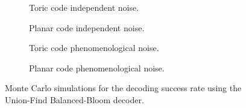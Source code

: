 \begin{figure}[htbp]
  \centering
  \begin{subfigure}[b]{0.49\textwidth}
    \begin{adjustbox}{Clip=0 1em 0 0}
      
    \end{adjustbox}
    \caption{Toric code independent noise.}
  \end{subfigure}
  \begin{subfigure}[b]{0.49\textwidth}
    \begin{adjustbox}{Clip=0 1em 0 0}
      
    \end{adjustbox}
    \caption{Planar code independent noise.}
  \end{subfigure}
  \begin{subfigure}[b]{0.49\textwidth}
    \begin{adjustbox}{Clip=0 1em 0 0}
      
    \end{adjustbox}
    \caption{Toric code phenomenological noise.}
  \end{subfigure}
  \begin{subfigure}[b]{0.49\textwidth}
    \begin{adjustbox}{Clip=0 1em 0 0}
      
    \end{adjustbox}
    \caption{Planar code phenomenological noise.}
  \end{subfigure}
  \caption{Monte Carlo simulations for the decoding success rate using the Union-Find Balanced-Bloom decoder.}
  \label{fig:threshold_ufbbbig}
\end{figure}
